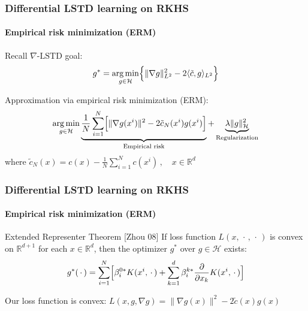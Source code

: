 \documentclass[xcolor=dvipsnames, subsection=false]{beamer}
\def\alertb#1{\alert{\color{BrickRed}  #1}}
\def\alertb#1{\alert{\color{BrickRed}  #1}}
\def\clH{{\mathcal H}}
\def\tilc{\tilde c}
\newcommand{\field}[1]{\mathbb{#1}}
\def\Re{\field{R}}
\def\varble{\,\cdot\,}
\def\argmin{\mathop{\rm arg\, min}}
\def\eqdef{\mathbin{:=}}
\def\gradTD{\nabla\text{-LSTD}}
\def\bl#1{{\color{blue}#1}}
\begin{document}
%	
%	
%	

\begin{frame}
\frametitle{Differential LSTD learning on RKHS}
\framesubtitle{Empirical risk minimization (ERM)}

\begin{minipage}[t][6.5cm][t]{\textwidth}
	
	Recall $\gradTD$ goal:
	\[
	g^* = \argmin_{g\in \clH}   \Bigl\{   \|\nabla g  \|_{L^2}^2   -  2 \langle  \tilc,   g \rangle_{L^2}   \Bigr\}
	\]
	
	Approximation via \alertb{empirical risk minimization (ERM)}:
	\[
	\argmin_{g \in \clH} \underbrace{\frac{1}{N} \sum_{i=1}^N\Bigl[ \| \nabla g(x^i) \|^2 - 2 \tilc_N(x^i)g(x^i)\Bigr]}_{\text{Empirical risk}} + \underbrace{\lambda \|g\|_\clH^2}_{\text{Regularization}}
	\]
 where $\tilc_N(x) = c(x) - \frac{1}{N}  \sum_{i=1}^N  c(x^i)\,,\quad x\in\Re^d\, $
\end{minipage}
\end{frame}

\begin{frame}
\frametitle{Differential LSTD learning on RKHS}
\framesubtitle{Empirical risk minimization (ERM)}
\begin{block}{\alertb{Extended Representer Theorem} {\footnotesize\bl{[Zhou 08]}}}
	If loss function
	$L(x,\varble,\varble)$ is convex   on $\Re^{d+1}$ for each $x\in\Re^d$, then the  optimizer $g^*$ over $g\in\clH$ exists:
	\[
	g^*(\varble) = \sum_{i=1}^N  \Bigl[
	\beta_i^{0*}  K(x^i, \varble)   +  \sum_{k =1}^d  \beta_i^{k*} \frac{\partial}{\partial x_k}  K(x^i, \varble) \Bigr]
	\]
\end{block}
\vfill
\pause
\centering
Our loss function is convex:   $L(x,g,\nabla g) = \| \nabla g(x)\|^2 - 2 \tilc(x) g(x)$
\end{frame}
\end{document}
